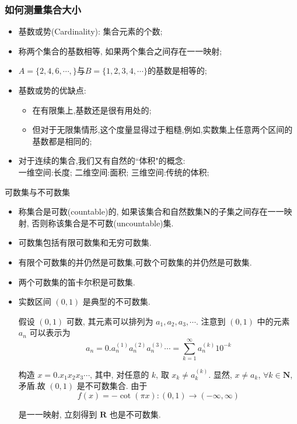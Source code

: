 \begin{frame}
	\frametitle{如何测量集合大小}
	\begin{itemize}[<+-|alert@+>]
		\item  基数或势({\rm Cardinality}): 集合元素的个数;
		\item 称两个集合的基数相等, 如果两个集合之间存在一一映射;
		\item $A=\{2,4,6,\cdots,\}$与$B=\{1,2,3,4,\cdots\}$的基数是相等的;
		\item  基数或势的优缺点:
		\begin{itemize}[<+-|alert@+>]
			\item 在有限集上,基数还是很有用处的;
			\item 但对于无限集情形,这个度量显得过于粗糙,例如,实数集上任意两个区间的基数都是相同的;
		\end{itemize}
		\item 对于连续的集合,我们又有自然的``体积"的概念: \\
		一维空间:长度; 二维空间:面积; 三维空间:传统的体积;


	\end{itemize}
\end{frame}
\begin{frame}{可数集与不可数集}
\begin{itemize}[<+-|alert@+>]
	\item 称集合是可数(countable)的, 如果该集合和自然数集${\mathbf{N}}$的子集之间存在一一映射, 否则称该集合是不可数(uncountable)集.
	\item 可数集包括有限可数集和无穷可数集.
	\item 有限个可数集的并仍然是可数集,可数个可数集的并仍然是可数集.
	\item 两个可数集的笛卡尔积是可数集.
	\item 实数区间 ${(0,1)}$ 是典型的不可数集.\pause

	假设 ${(0,1)}$ 可数, 其元素可以排列为 ${a_{1}, a_{2}, a_{3}, \cdots}$. 注意到 ${(0,1)}$ 中的元素 ${a_{n}}$ 可以表示为
	\[
	a_{n}=0. a_{n}^{(1)} a_{n}^{(2)} a_{n}^{(3)} \cdots=\sum_{k=1}^{\infty} a_{n}^{(k)} 10^{-k}
	\]
	\pause

	构造 ${x=0.x_{1} x_{2} x_{3} \cdots}$, 其中, 对任意的 ${k}$, 取 ${x_{k} \neq a_{k}^{(k)}}$. \pause 显然, $x \neq a_{k}$, $\forall k \in \mathbf{N}$,矛盾.故 ${(0,1)}$ 是不可数集合. 由于
	\[
	f(x)=-\cot (\pi x):(0,1) \rightarrow(-\infty, \infty)
	\]

	是一一映射, 立刻得到 ${\mathbf{R}}$ 也是不可数集. %
\end{itemize}

\end{frame}


